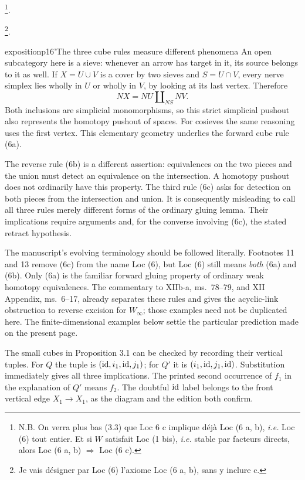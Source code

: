 \noindent\footnote[12]{N.B. On verra plus bas (3.3) que Loc 6 c implique déjà Loc (6 a, b), \textit{i.e.} Loc (6) tout entier. Et si $W$ satisfait Loc (1 bis), \textit{i.e.} stable par facteurs directs, alors Loc (6 a, b) $\Longrightarrow$ Loc (6 c).}.

\noindent\footnote[13]{Je vais désigner par Loc (6) l'axiome Loc (6 a, b), sans y inclure c.}.

\begin{dcomment}{exposition}{p16'}{The three cube rules measure different phenomena}
An open subcategory here is a sieve: whenever an arrow has target in it, its source belongs to it as well. If $X=U\cup V$ is a cover by two sieves and $S=U\cap V$, every nerve simplex lies wholly in $U$ or wholly in $V$, by looking at its last vertex. Therefore
\[
NX=NU\amalg_{NS}NV.
\]
Both inclusions are simplicial monomorphisms, so this strict simplicial pushout also represents the homotopy pushout of spaces. For cosieves the same reasoning uses the first vertex. This elementary geometry underlies the forward cube rule (6a).

The reverse rule (6b) is a different assertion: equivalences on the two pieces and the union must detect an equivalence on the intersection. A homotopy pushout does not ordinarily have this property. The third rule (6c) asks for detection on both pieces from the intersection and union. It is consequently misleading to call all three rules merely different forms of the ordinary gluing lemma. Their implications require arguments and, for the converse involving (6c), the stated retract hypothesis.

The manuscript's evolving terminology should be followed literally. Footnotes 11 and 13 remove (6c) from the name Loc (6), but Loc (6) still means \emph{both} (6a) and (6b). Only (6a) is the familiar forward gluing property of ordinary weak homotopy equivalences. The commentary to XIIb-a, ms.~78--79, and XII Appendix, ms.~6--17, already separates these rules and gives the acyclic-link obstruction to reverse excision for $W_\infty$; those examples need not be duplicated here. The finite-dimensional examples below settle the particular prediction made on the present page.

The small cubes in Proposition 3.1 can be checked by recording their vertical tuples. For $Q$ the tuple is $(\mathrm{id},i_1,\mathrm{id},j_1)$; for $Q'$ it is $(i_1,\mathrm{id},j_1,\mathrm{id})$. Substitution immediately gives all three implications. The printed second occurrence of $f_1$ in the explanation of $Q'$ means $f_2$. The doubtful $\mathrm{id}$ label belongs to the front vertical edge $X_1\to X_1$, as the diagram and the edition both confirm.
\end{dcomment}


